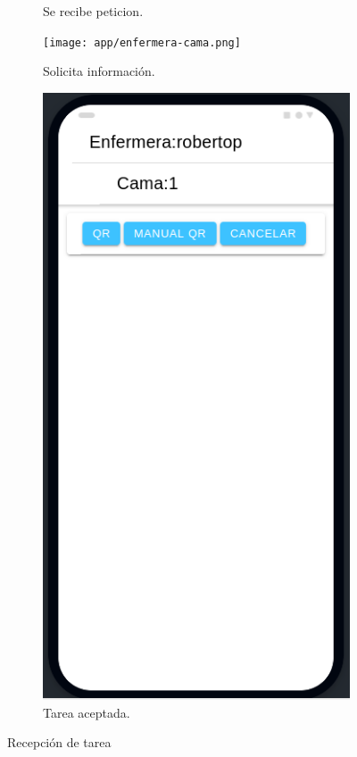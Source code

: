 \begin{figure}[!htpb]
\begin{subfigure}[b]{0.3\textwidth}
         \caption{Se recibe peticion.}
         \label{fig_2:1de3}
     \end{subfigure}
     \hfill
     \begin{subfigure}[b]{0.3\textwidth}
         \centering
         \texttt{[image: app/enfermera-cama.png]}
         \caption{Solicita información.}
         \label{fig_2:2de3}
     \end{subfigure}
     \hfill
     \begin{subfigure}[b]{0.3\textwidth}
         \centering
         \includegraphics[width=.95\textwidth]{./Figures/app/yendo-enfermera.png}
         \caption{Tarea aceptada.}
         \label{fig_2:3de3}
     \end{subfigure}
        \caption{Recepción de tarea}
        \label{fig_2:Recepción de tarea}
\end{figure}

